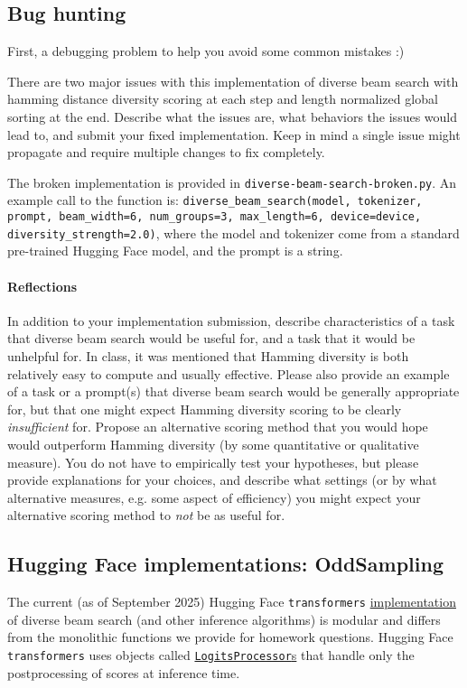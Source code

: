 \documentclass{article}
\begin{document}
\subsection{Bug hunting}
First, a debugging problem to help you avoid some common mistakes :)

There are two major issues with this implementation of diverse beam search \cite{vijayakumar2018diversebeamsearchdecoding} with hamming distance diversity scoring at each step and length normalized global sorting at the end. Describe what the issues are, what behaviors the issues would lead to, and submit your fixed implementation. Keep in mind a single issue might propagate and require multiple changes to fix completely.

The broken implementation is provided in \texttt{diverse-beam-search-broken.py}. 
An example call to the function is:
\texttt{diverse\_beam\_search(model, tokenizer, prompt, beam\_width=6, num\_groups=3, max\_length=6, device=device, diversity\_strength=2.0)}, where the model and tokenizer come from a standard pre-trained Hugging Face model, and the prompt is a string.


\paragraph{Reflections} In addition to your implementation submission, describe characteristics of a task that diverse beam search would be useful for, and a task that it would be unhelpful for. In class, it was mentioned that Hamming diversity is both relatively easy to compute and usually effective. Please also provide an example of a task or a prompt(s) that diverse beam search would be generally appropriate for, but that one might expect Hamming diversity scoring to be clearly \textit{insufficient} for. Propose an alternative scoring method that you would hope would outperform Hamming diversity (by some quantitative or qualitative measure). You do not have to empirically test your hypotheses, but please provide explanations for your choices, and describe what settings (or by what alternative measures, e.g. some aspect of efficiency) you might expect your alternative scoring method to \textit{not} be as useful for.

\subsection{Hugging Face implementations: OddSampling}
The current (as of September 2025) Hugging Face \texttt{transformers} \href{https://github.com/huggingface/transformers/blob/34595cf296b1eafce294fd9aa5f43cb53d014930/src/transformers/generation/logits_process.py#L1509}{implementation} of diverse beam search (and other inference algorithms) is modular and differs from the monolithic functions we provide for homework questions. Hugging Face \texttt{transformers} uses objects called \href{https://huggingface.co/docs/transformers/v4.56.0/en/internal/generation_utils#transformers.LogitsProcessor}{\texttt{LogitsProcessor}s} that handle only the postprocessing of scores at inference time. 
\end{document}
